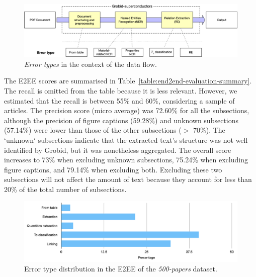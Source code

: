 \begin{figure}[htbp]
    \centering
    \includegraphics[width=\textwidth]{figures/automatic_extraction_supercon/error-types-colors}
    \caption{\textit{Error types} in the context of the data flow. }
    \label{fig:error-types}
\end{figure}

The E2EE scores are summarised in Table~\ref{table:end2end-evaluation-summary}.
The recall is omitted from the table because it is less relevant. However, we estimated that the recall is between 55\% and 60\%, considering a sample of articles. 
The precision score (micro average) was 72.60\% for all the subsections, although the precision of figure captions (59.28\%) and unknown subsections (57.14\%) were lower than those of the other subsections ($>$ 70\%).
The `unknown` subsections indicate that the extracted text's structure was not well identified by Grobid, but it was nonetheless aggregated.
The overall score increases to 73\% when excluding unknown subsections, 75.24\% when excluding figure captions, and 79.14\%  when excluding both.
Excluding these two subsections will not affect the amount of text because they account for less than 20\% of the total number of subsections.

\begin{figure}[htbp]
    \centering
    \includegraphics[width=\linewidth]{figures/automatic_extraction_supercon/error-types-bars-perc}
    \caption{Error type distribution in the E2EE of the \textit{500-papers} dataset.}
    \label{fig:error-types-distribution}
\end{figure}

